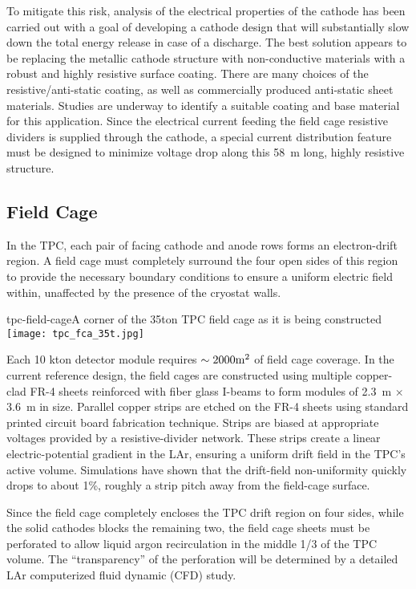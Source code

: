 To mitigate this risk, analysis of the electrical properties of the cathode has been carried out with a goal of developing a cathode design that will substantially slow down the total energy release in case of a discharge.  The best solution appears to be replacing the metallic cathode structure with non-conductive materials with a robust and highly resistive surface coating.  There are many choices of the resistive/anti-static coating, as well as commercially produced anti-static sheet materials.   Studies are underway to identify a suitable coating and base material for this application.  Since the electrical current feeding the field cage resistive dividers is supplied through the cathode, a special current distribution feature must be designed to minimize voltage drop along this 58~m long, highly resistive structure.


\subsection{Field Cage}
\label{subsec:fd-ref-fieldcage}

In the TPC, each pair of facing cathode and anode rows forms an electron-drift region. A field cage must completely surround the four open sides of this region
to provide the necessary boundary conditions to ensure a uniform electric field within, unaffected by the presence of the cryostat walls.


\begin{cdrfigure}{tpc-field-cage}{A corner of the 35ton TPC field cage as it is being constructed}
\texttt{[image: tpc\_fca\_35t.jpg]}
\end{cdrfigure}


Each 10 kton detector module requires $\sim 2000 \rm{m}^2$ of field 
cage coverage. In the current reference design, the field cages are constructed using multiple copper-clad FR-4 sheets reinforced with fiber glass I-beams to form modules of 2.3~m $\times$ 3.6~m in size. Parallel copper strips are etched on the FR-4 sheets using standard printed circuit board fabrication technique. Strips are biased at appropriate voltages provided by a resistive-divider network. These strips create a linear electric-potential gradient in the LAr, ensuring a uniform drift field in the TPC's active volume.  Simulations have shown that the drift-field non-uniformity quickly drops to about 1\%, roughly a strip pitch away from the field-cage surface. 

Since the field cage completely encloses the TPC drift region on four sides, while the solid cathodes blocks the remaining two, the field cage sheets must be  perforated to allow liquid argon recirculation in the middle 1/3 of the TPC volume. The ``transparency'' of the perforation will be determined by a detailed LAr computerized fluid dynamic (CFD) study.

